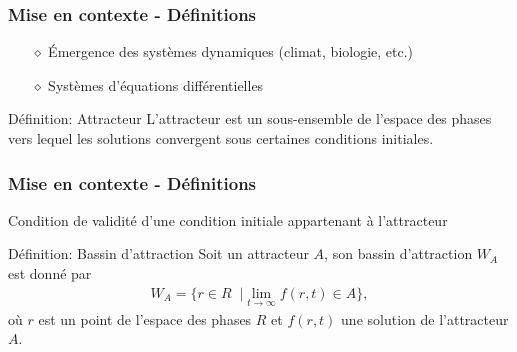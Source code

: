\begin{frame}
    \frametitle{Mise en contexte - Définitions}
    \begin{itemize}
        \setlength\itemsep{1em}
        \item[$\diamond$] Émergence des systèmes dynamiques (climat, biologie, etc.) \\
        \item[$\diamond$] Systèmes d'équations différentielles \\
    \end{itemize}
    \vspace{0.5cm}
    \begin{defblock}{Définition: Attracteur}
        L'attracteur est un sous-ensemble de l'espace des phases vers lequel les solutions convergent sous certaines conditions initiales.
    \end{defblock}
\end{frame}

\begin{frame}
    \frametitle{Mise en contexte - Définitions}
    Condition de validité d'une condition initiale appartenant à l'attracteur
    \vspace{0.5cm}
    \begin{defblock}{Définition: Bassin d'attraction}
        Soit un attracteur $A$, son bassin d'attraction $W_A$ est donné par
        \begin{align}
            W_A = \{r\in R\;\;| \lim_{t\to\infty}f(r, t)\in A\},
        \end{align}
        où $r$ est un point de l'espace des phases $R$ et $f(r, t)$  une solution de l'attracteur $A$.
    \end{defblock}
\end{frame}

